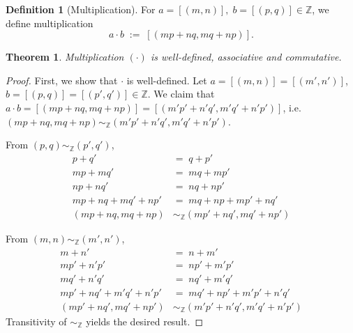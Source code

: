\documentclass[10pt]{article}
\newtheorem{theorem}{Theorem}[section]
\theoremstyle{definition}
\newtheorem*{definition}{Definition}
\theoremstyle{remark}
\begin{document}
        \begin{definition}[Multiplication]
        For $a = [(m, n)],\; b = [(p, q)] \in \mathbb{Z}$, we define multiplication
        \[
                a \cdot b \;:=\; [(mp + nq, mq + np)].
        \]
        \end{definition}
        \begin{theorem}
                Multiplication $(\cdot)$ is well-defined, associative and commutative.
        \end{theorem}
        \begin{proof}
                First, we show that $\cdot$ is well-defined.
                Let $a = [(m, n)] = [(m', n')]$, $b = [(p, q)] = [(p', q')] \in \mathbb{Z}$.
                We claim that $a\cdot b = [(mp + nq, mq + np)] = [(m'p' + n'q', m'q' + n'p')]$,
                i.e. $(mp + nq, mq + np) \sim_{\mathbb{Z}} (m'p' + n'q', m'q' + n'p')$.

                From $(p, q) \sim_{\mathbb{Z}} (p', q')$,
                \begin{align*}
                        p + q' \;&=\; q + p' \\
                        mp + mq' \;&=\; mq + mp' \\
                        np + nq' \;&=\; nq + np' \\
                        mp + nq + mq' + np' \;&=\; mq + np + mp' + nq' \\
                        (mp + nq, mq + np) &\sim_{\mathbb{Z}} (mp' + nq', mq' + np')
                \end{align*}

                From $(m, n) \sim_{\mathbb{Z}} (m', n')$,
                \begin{align*}
                        m + n' \;&=\; n + m' \\
                        mp' + n'p' \;&=\; np' + m'p' \\
                        mq' + n'q' \;&=\; nq' + m'q' \\
                        mp' + nq' + m'q' + n'p' \;&=\; mq' + np' + m'p' + n'q' \\
                        (mp' + nq', mq' + np') &\sim_{\mathbb{Z}} (m'p' + n'q', m'q' + n'p')
                \end{align*}
                Transitivity of $\sim_{\mathbb{Z}}$ yields the desired result.


\end{proof}
\end{document}
